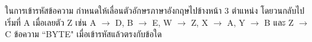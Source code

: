 \question ในการเข้ารหัสข้อความ กำหนดให้เลื่อนตัวอักษรภาษาอังกฤษไปข้างหน้า $3$ ตำแหน่ง โดยวนกลับไปเริ่มที่ A เมื่อเลยตัว Z เช่น A $\rightarrow$ D, B $\rightarrow$ E, W $\rightarrow$ Z, X $\rightarrow$ A, Y $\rightarrow$ B และ Z $\rightarrow$ C ข้อความ ``BYTE" เมื่อเข้ารหัสแล้วตรงกับข้อใด
\newline
{}
